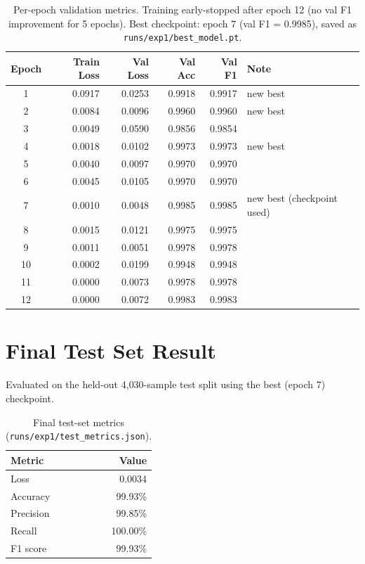\documentclass[11pt]{article}
\begin{document}
\begin{table}[h]
\centering
\begin{tabular}{crrrrl}
\toprule
\textbf{Epoch} & \textbf{Train Loss} & \textbf{Val Loss} & \textbf{Val Acc} & \textbf{Val F1} & \textbf{Note} \\
\midrule
1  & 0.0917 & 0.0253 & 0.9918 & 0.9917 & new best \\
2  & 0.0084 & 0.0096 & 0.9960 & 0.9960 & new best \\
3  & 0.0049 & 0.0590 & 0.9856 & 0.9854 & \\
4  & 0.0018 & 0.0102 & 0.9973 & 0.9973 & new best \\
5  & 0.0040 & 0.0097 & 0.9970 & 0.9970 & \\
6  & 0.0045 & 0.0105 & 0.9970 & 0.9970 & \\
7  & 0.0010 & 0.0048 & 0.9985 & 0.9985 & new best (checkpoint used) \\
8  & 0.0015 & 0.0121 & 0.9975 & 0.9975 & \\
9  & 0.0011 & 0.0051 & 0.9978 & 0.9978 & \\
10 & 0.0002 & 0.0199 & 0.9948 & 0.9948 & \\
11 & 0.0000 & 0.0073 & 0.9978 & 0.9978 & \\
12 & 0.0000 & 0.0072 & 0.9983 & 0.9983 & \\
\bottomrule
\end{tabular}
\caption{Per-epoch validation metrics. Training early-stopped after epoch 12 (no val F1 improvement for 5 epochs). Best checkpoint: epoch 7 (val F1 = 0.9985), saved as \texttt{runs/exp1/best\_model.pt}.}
\end{table}

\section{Final Test Set Result}

Evaluated on the held-out 4{,}030-sample test split using the best (epoch 7) checkpoint.

\begin{table}[h]
\centering
\begin{tabular}{lr}
\toprule
\textbf{Metric} & \textbf{Value} \\
\midrule
Loss & 0.0034 \\
Accuracy & 99.93\% \\
Precision & 99.85\% \\
Recall & 100.00\% \\
F1 score & 99.93\% \\
\bottomrule
\end{tabular}
\caption{Final test-set metrics (\texttt{runs/exp1/test\_metrics.json}).}
\end{table}
\end{document}
